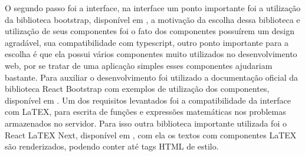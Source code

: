 O segundo passo foi a interface, na interface um ponto importante foi a utilização da biblioteca bootstrap, disponível em \cite{react:bootstrap}, a motivação da escolha dessa biblioteca e utilização de seus componentes foi o fato dos componentes possuírem um design agradável, sua compatibilidade com typescript, outro ponto importante para a escolha é que ela possui vários componentes muito utilizados no desenvolvimento web, por se tratar de uma aplicação simples esses componentes ajudariam bastante. Para auxiliar o desenvolvimento foi utilizado a documentação oficial da biblioteca React Bootstrap com exemplos de utilização dos componentes, disponível em \cite{doc:react:bootstrap}. Um dos requisitos levantados foi a compatibilidade da interface com LaTEX, para escrita de funções e expressões matemáticas nos problemas armazenados no servidor. Para isso outra biblioteca importante utilizada foi o React LaTEX Next, disponível em \cite{repo:react:latex:next}, com ela os textos com componentes LaTEX são renderizados, podendo conter até tags HTML de estilo.
